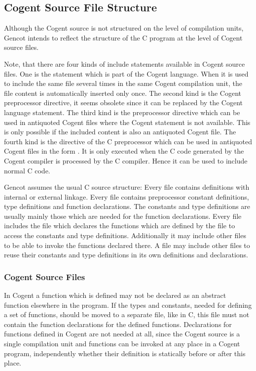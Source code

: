 \subsection{Cogent Source File Structure}
\label{design-files}

Although the Cogent source is not structured on the level of compilation units, Gencot intends to reflect the structure of 
the C program at the level of Cogent source files. 

Note, that there are four kinds of include statements available in Cogent source files. One is the  statement which
is part of the Cogent language. When it is used to include the same file several times in the same Cogent compilation unit,
the file content is automatically inserted only once. The second kind is the Cogent preprocessor  directive, 
it seems obsolete since it can be replaced by the Cogent language  statement.
The third kind is the preprocessor  directive 
which can be used in antiquoted Cogent files where the Cogent  statement is not available. This is only possible 
if the included content is also an antiquoted Cogent file. The fourth kind
is the  directive of the C preprocessor which can be used in antiquoted Cogent files in the form 
. It is only executed when the C code generated by the Cogent compiler is processed by the C compiler.
Hence it can be used to include normal C code.

Gencot assumes the usual C source structure: Every  file contains definitions with internal or external linkage.
Every 
file contains preprocessor constant definitions, type definitions and function declarations. The constants and type definitions 
are usually mainly those which are needed for the function declarations. Every  file includes the  file which
declares the functions which are defined by the  file to access the constants and type definitions. Additionally it may
include other  files to be able to invoke the functions declared there. A  file may include other  files
to reuse their constants and type definitions in its own definitions and declarations.

\subsubsection{Cogent Source Files}

In Cogent a function which is defined may not be declared as an abstract function elsewhere in the program. If the types and constants,
needed for defining a set of functions, should be moved to a separate file, like in C, this file must not contain the 
function declarations for the defined functions. Declarations for functions defined in Cogent are not needed at all, since the Cogent 
source is a single compilation unit and functions can be invoked at any place in a Cogent program, independently whether their definition 
is statically before or after this place.

